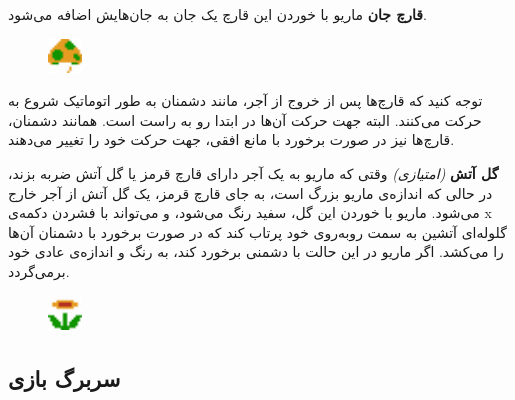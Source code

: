 \documentclass{utap}
\begin{document}
\begin{itemize}
	\begin{minipage}{.75\textwidth}
		\item
\textbf{قارچ جان}
ماریو با خوردن این قارچ یک جان به جان‌هایش اضافه می‌شود.
\end{minipage}
\begin{minipage}{.15\textwidth}
\begin{figure}[H]
	\begin{center}
		\includegraphics[width=0.9cm]{health}
	\end{center}
\end{figure}
\end{minipage}

توجه کنید که قارچ‌ها پس از خروج از آجر، مانند دشمنان به طور اتوماتیک شروع به حرکت می‌کنند. البته جهت حرکت آن‌ها در ابتدا رو به راست است. همانند دشمنان، قارچ‌ها نیز در صورت برخورد با مانع افقی، جهت حرکت خود را تغییر می‌دهند.
	
	\begin{minipage}{.75\textwidth}
		\item
		\textbf{گل آتش} \textit{(امتیازی)}
		وقتی که ماریو به یک آجر دارای قارچ قرمز یا گل آتش ضربه بزند، در حالی که اندازه‌ی ماریو بزرگ است، به جای قارچ قرمز، یک گل آتش از آجر خارج می‌شود. ماریو با خوردن این گل، سفید رنگ می‌شود، و می‌تواند با فشردن دکمه‌ی x گلوله‌ای آتشین به سمت روبه‌روی خود پرتاب کند که در صورت برخورد با دشمنان آن‌ها را می‌کشد. اگر ماریو در این حالت با دشمنی برخورد کند، به رنگ و اندازه‌ی عادی خود برمی‌گردد.
	\end{minipage}
	\begin{minipage}{.15\textwidth}
		\begin{figure}[H]
			\begin{center}
				\includegraphics[width=0.9cm]{flower}
			\end{center}
		\end{figure}
	\end{minipage}
	

	\end{itemize}

	\subsection{سربرگ‌ بازی}
\end{document}
